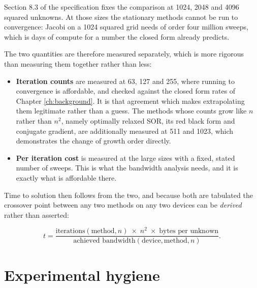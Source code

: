Section 8.3 of the specification fixes the comparison at 1024, 2048 and 4096
squared unknowns. At those sizes the stationary methods cannot be run to
convergence: Jacobi on a 1024 squared grid needs of order four million sweeps,
which is days of compute for a number the closed form already predicts.

The two quantities are therefore measured separately, which is more rigorous
than measuring them together rather than less:

\begin{itemize}
  \item \textbf{Iteration counts} are measured at 63, 127 and 255, where running
        to convergence is affordable, and checked against the closed form rates
        of Chapter \ref{ch:background}. It is that agreement which makes
        extrapolating them legitimate rather than a guess. The methods whose
        counts grow like $n$ rather than $n^2$, namely optimally relaxed SOR, its
        red black form and conjugate gradient, are additionally measured at 511
        and 1023, which demonstrates the change of growth order directly.
  \item \textbf{Per iteration cost} is measured at the large sizes with a fixed,
        stated number of sweeps. This is what the bandwidth analysis needs, and
        it is exactly what is affordable there.
\end{itemize}

Time to solution then follows from the two, and because both are tabulated the
crossover point between any two methods on any two devices can be \emph{derived}
rather than asserted:

\begin{equation}
  t = \frac{\text{iterations}(\text{method}, n)\;\times\;n^2\;\times\;\text{bytes per unknown}}
           {\text{achieved bandwidth}(\text{device}, \text{method}, n)} .
  \label{eq:crossover}
\end{equation}

\section{Experimental hygiene}

